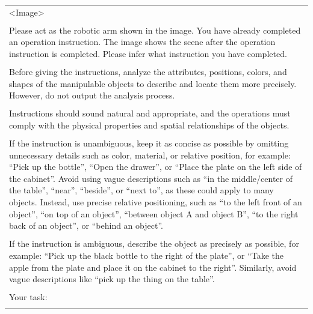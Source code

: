 \begin{table}[h!]\centering
\begin{minipage}{0.99\columnwidth}\vspace{0mm}    \centering
\begin{tcolorbox}
    \centering
   
     \hspace{-4mm}
      \scriptsize
    \begin{tabular}{p{}}
\textless Image\textgreater \\
\\
Please act as the robotic arm shown in the image. You have already completed an operation instruction. The image shows the scene after the operation instruction is completed. Please infer what instruction you have completed. \\
\\
Before giving the instructions, analyze the attributes, positions, colors, and shapes of the manipulable objects to describe and locate them more precisely. However, do not output the analysis process. \\
\\
Instructions should sound natural and appropriate, and the operations must comply with the physical properties and spatial relationships of the objects. \\
\\
If the instruction is unambiguous, keep it as concise as possible by omitting unnecessary details such as color, material, or relative position, for example: ``Pick up the bottle'', ``Open the drawer'', or ``Place the plate on the left side of the cabinet''. Avoid using vague descriptions such as ``in the middle/center of the table'', ``near'', ``beside'', or ``next to'', as these could apply to many objects. Instead, use precise relative positioning, such as ``to the left front of an object'', ``on top of an object'', ``between object A and object B'', ``to the right back of an object'', or ``behind an object''. \\
\\
If the instruction is ambiguous, describe the object as precisely as possible, for example: ``Pick up the black bottle to the right of the plate'', or ``Take the apple from the plate and place it on the cabinet to the right''. Similarly, avoid vague descriptions like ``pick up the thing on the table''. \\
\\
Your task: \\
\\

\end{tabular}
\end{tcolorbox}
\end{minipage}
\end{table}
